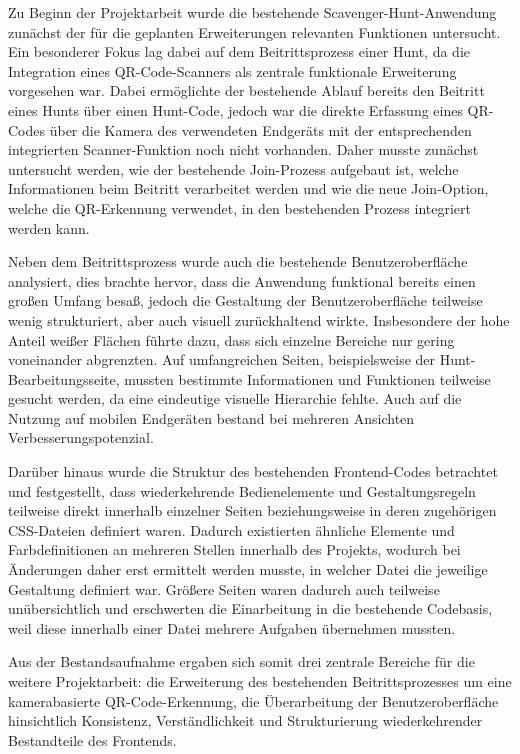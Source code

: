 ﻿\documentclass[oneside]{ausarbeitung}
\begin{document}
Zu Beginn der Projektarbeit wurde die bestehende Scavenger-Hunt-Anwendung zunächst der für die geplanten Erweiterungen relevanten Funktionen untersucht. Ein 
besonderer Fokus lag dabei auf dem Beitrittsprozess einer Hunt, da die Integration eines QR-Code-Scanners als zentrale funktionale Erweiterung vorgesehen war. Dabei
ermöglichte der bestehende Ablauf bereits den Beitritt eines Hunts über einen Hunt-Code, jedoch war die direkte Erfassung eines QR-Codes über die Kamera des verwendeten
Endgeräts mit der entsprechenden integrierten Scanner-Funktion noch nicht vorhanden. Daher musste zunächst untersucht werden, wie der bestehende Join-Prozess
aufgebaut ist, welche Informationen beim Beitritt verarbeitet werden und wie die neue Join-Option, welche die QR-Erkennung verwendet, in den bestehenden Prozess
integriert werden kann.

Neben dem Beitrittsprozess wurde auch die bestehende Benutzeroberfläche analysiert, dies brachte hervor, dass die Anwendung funktional bereits einen großen Umfang 
besaß, jedoch die Gestaltung der Benutzeroberfläche teilweise wenig strukturiert, aber auch visuell zurückhaltend wirkte. Insbesondere der hohe Anteil weißer Flächen
führte dazu, dass sich einzelne Bereiche nur gering voneinander abgrenzten. Auf umfangreichen Seiten, beispielsweise der Hunt-Bearbeitungsseite, mussten bestimmte
Informationen und Funktionen teilweise gesucht werden, da eine eindeutige visuelle Hierarchie fehlte. Auch auf die Nutzung auf mobilen Endgeräten bestand bei 
mehreren Ansichten Verbesserungspotenzial.

Darüber hinaus wurde die Struktur des bestehenden Frontend-Codes betrachtet und festgestellt, dass wiederkehrende Bedienelemente und Gestaltungsregeln teilweise
direkt innerhalb einzelner Seiten beziehungsweise in deren zugehörigen CSS-Dateien definiert waren. Dadurch existierten ähnliche Elemente und Farbdefinitionen
an mehreren Stellen innerhalb des Projekts, wodurch bei Änderungen daher erst ermittelt werden musste, in welcher Datei die jeweilige Gestaltung definiert war.
Größere Seiten waren dadurch auch teilweise unübersichtlich und erschwerten die Einarbeitung in die bestehende Codebasis, weil diese innerhalb einer Datei mehrere
Aufgaben übernehmen mussten.

Aus der Bestandsaufnahme ergaben sich somit drei zentrale Bereiche für die weitere Projektarbeit: die Erweiterung des bestehenden Beitrittsprozesses um eine 
kamerabasierte QR-Code-Erkennung, die Überarbeitung der Benutzeroberfläche hinsichtlich Konsistenz, Verständlichkeit und Strukturierung wiederkehrender Bestandteile 
des Frontends.
\end{document}
